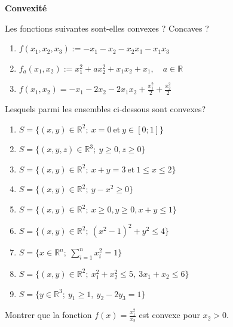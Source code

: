 
\begin{center}
	\textbf{{\large Convexité}}
\end{center}

\begin{exo}
	Les fonctions suivantes sont-elles convexes ? Concaves ?
	\begin{enumerate}
		\item \( f(x_1, x_2, x_3) := -x_1 - x_2 - x_2x_3 - x_1x_3 \)
		\item \( f_a(x_1, x_2) := x_1^2 + a x_2^2 + x_1x_2 + x_1, \quad a \in \mathbb{R} \)
		\item \( f(x_1, x_2) = -x_1 - 2x_2 - 2x_1x_2 + \frac{x_1^2}{2} + \frac{x_2^2}{2} \)
	\end{enumerate}
\end{exo}

\begin{exo}
	Lesquels parmi les ensembles ci-dessous sont convexes?
	\begin{enumerate}[label=\arabic*.]
		\item \( S = \{(x, y) \in \mathbb{R}^2; \ x = 0 \ \text{et} \ y \in [0; 1]\} \)
		\item \( S = \{(x, y, z) \in \mathbb{R}^3; \ y \geq 0, z \geq 0\} \)
		\item \( S = \{(x, y) \in \mathbb{R}^2; \ x + y = 3 \ \text{et} \ 1 \leq x \leq 2\} \)
		\item \( S = \{(x, y) \in \mathbb{R}^2; \ y - x^2 \geq 0\} \)
		\item \( S = \{(x, y) \in \mathbb{R}^2; \ x \geq 0, y \geq 0, x + y \leq 1\} \)
		\item \( S = \{(x, y) \in \mathbb{R}^2; \ (x^2 - 1)^2 + y^2 \leq 4\} \)
		\item \( S = \{x \in \mathbb{R}^n; \ \sum_{i=1}^n x_i^2 = 1\} \)
		\item \( S = \{(x, y) \in \mathbb{R}^2; \ x_1^2 + x_2^2 \leq 5, \ 3x_1 + x_2 \leq 6\} \)
		\item \( S = \{y \in \mathbb{R}^3; \ y_1 \geq 1, \ y_2 - 2y_3 = 1\} \)
	\end{enumerate}
\end{exo}

\begin{exo}
	Montrer que la fonction $f(x) = \frac{x_{1}^{2}}{x_{2}}$ est convexe pour $x_{2} > 0$.
\end{exo}

